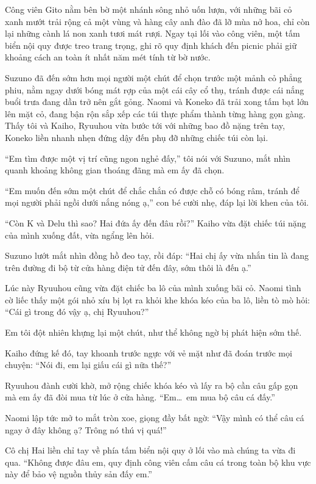 ﻿\documentclass[../main.tex]{subfiles}
\begin{document}
\ct

Công viên Gito nằm bên bờ một nhánh sông nhỏ uốn lượn, với những bãi cỏ xanh mướt trải rộng cả một vùng và hàng cây anh đào đã lỡ mùa nở hoa, chỉ còn lại những cành lá non xanh tươi mát rượi. Ngay tại lối vào công viên, một tấm biển nội quy được treo trang trọng, ghi rõ quy định khách đến picnic phải giữ khoảng cách an toàn ít nhất năm mét tính từ bờ nước.

Suzuno đã đến sớm hơn mọi người một chút để chọn trước một mảnh cỏ phẳng phiu, nằm ngay dưới bóng mát rợp của một cái cây cổ thụ, tránh được cái nắng buổi trưa đang dần trở nên gắt gỏng. Naomi và Koneko đã trải xong tấm bạt lớn lên mặt cỏ, đang bận rộn sắp xếp các túi thực phẩm thành từng hàng gọn gàng. Thấy tôi và Kaiho, Ryuuhou vừa bước tới với những bao đồ nặng trên tay, Koneko liền nhanh nhẹn đứng dậy đến phụ đỡ những chiếc túi còn lại.

``Em tìm được một vị trí cũng ngon nghẻ đấy,'' tôi nói với Suzuno, mắt nhìn quanh khoảng không gian thoáng đãng mà em ấy đã chọn.

``Em muốn đến sớm một chút để chắc chắn có được chỗ có bóng râm, tránh để mọi người phải ngồi dưới nắng nóng ạ,'' con bé cười nhẹ, đáp lại lời khen của tôi.

``Còn K và Delu thì sao? Hai đứa ấy đến đâu rồi?'' Kaiho vừa đặt chiếc túi nặng của mình xuống đất, vừa ngẩng lên hỏi.

Suzuno lướt mắt nhìn đồng hồ đeo tay, rồi đáp: ``Hai chị ấy vừa nhắn tin là đang trên đường đi bộ từ cửa hàng điện tử đến đây, sớm thôi là đến ạ.''

Lúc này Ryuuhou cũng vừa đặt chiếc ba lô của mình xuống bãi cỏ. Naomi tình cờ liếc thấy một gói nhỏ xíu bị lọt ra khỏi khe khóa kéo của ba lô, liền tò mò hỏi: ``Cái gì trong đó vậy ạ, chị Ryuuhou?''

Em tôi đột nhiên khựng lại một chút, như thể không ngờ bị phát hiện sớm thế.

Kaiho đứng kế đó, tay khoanh trước ngực với vẻ mặt như đã đoán trước mọi chuyện: ``Nói đi, em lại giấu cái gì nữa thế?''

Ryuuhou đành cười khờ, mở rộng chiếc khóa kéo và lấy ra bộ cần câu gấp gọn mà em ấy đã đòi mua từ lúc ở cửa hàng. ``Em\dots\ em mua bộ câu cá đấy.''

Naomi lập tức mở to mắt tròn xoe, giọng đầy bất ngờ: ``Vậy mình có thể câu cá ngay ở đây không ạ? Trông nó thú vị quá!''

Cô chị Hai liền chỉ tay về phía tấm biển nội quy ở lối vào mà chúng ta vừa đi qua. ``Không được đâu em, quy định công viên cấm câu cá trong toàn bộ khu vực này để bảo vệ nguồn thủy sản đấy em.''
\end{document}
